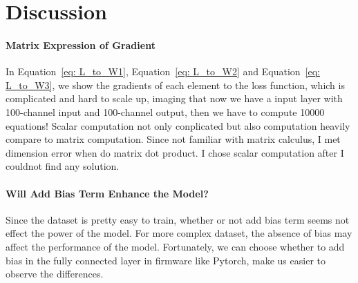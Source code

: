 \documentclass[12pt,a4paper]{article}
\begin{document}
\section{Discussion} \label{sec:discuss}
 
\paragraph{Matrix Expression of Gradient}
In Equation~\ref{eq: L_to_W1}, Equation~\ref{eq: L_to_W2} and Equation~\ref{eq: L_to_W3}, we show the gradients of each element to the loss function, which is complicated and hard to scale up, imaging that now we have a input layer with 100-channel input and 100-channel output, then we have to compute 10000 equations! Scalar computation not only conplicated but also computation heavily compare to matrix computation. Since not familiar with matrix calculus, I met dimension error when do matrix dot product. I chose scalar computation after I couldnot find any solution.
\paragraph{Will Add Bias Term Enhance the Model?}
Since the dataset is pretty easy to train, whether or not add bias term seems not effect the power of the model. For more complex dataset, the absence of bias may affect the performance of the model. Fortunately, we can choose whether to add bias in the fully connected layer in firmware like Pytorch, make us easier to observe the differences.
\end{document}
